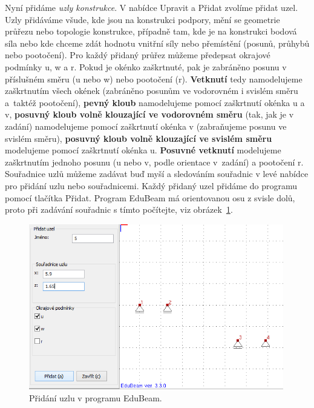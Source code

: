 \documentclass[12pt,fleqn]{article}
\begin{document}
Nyní přidáme \emph{uzly konstrukce}. V nabídce Upravit a Přidat zvolíme přidat uzel. Uzly přidáváme všude, kde jsou na konstrukci podpory, mění se geometrie průřezu nebo topologie konstrukce, případně tam, kde je na konstrukci bodová síla nebo kde chceme zdát hodnotu vnitřní síly nebo přemístění (posunů, průhybů nebo pootočení). Pro každý přidaný průřez můžeme předepsat okrajové podmínky u, w a r. Pokud je okénko zaškrtnuté, pak je zabráněno posunu v příslušném směru (u nebo w) nebo pootočení (r). \textbf{Vetknutí} tedy namodelujeme zaškrtnutím všech okének (zabráněno posunům ve vodorovném i svislém směru a~taktéž pootočení), \textbf{pevný kloub} namodelujeme pomocí zaškrtnutí okénka u a v, \textbf{posuvný kloub volně klouzající ve vodorovném směru} (tak, jak je v zadání) namodelujeme pomocí zaškrtnutí okénka v (zabraňujeme posunu ve svislém směru), \textbf{posuvný kloub volně klouzající ve svislém směru} modelujeme pomocí zaškrtnutí okénka u. \textbf{Posuvné vetknutí} modelujeme zaškrtnutím jednoho posunu (u nebo v, podle orientace v~zadání) a pootočení r. Souřadnice uzlů můžeme zadávat buď myší a sledováním souřadnic v levé nabídce pro přidání uzlu nebo souřadnicemi. Každý přidaný uzel přidáme do programu pomocí tlačítka Přidat. Program EduBeam má orientovanou osu z svisle dolů, proto při zadávání souřadnic s tímto počítejte, viz obrázek~\ref{fig:EduBeam_uzel}.

\begin{figure}[ht]
\centering
\includegraphics[width=0.99\textwidth]{figs/eduBeam_uzly.png}\caption{Přidání uzlu v programu EduBeam.}\label{fig:EduBeam_uzel}
\end{figure}
\end{document}
